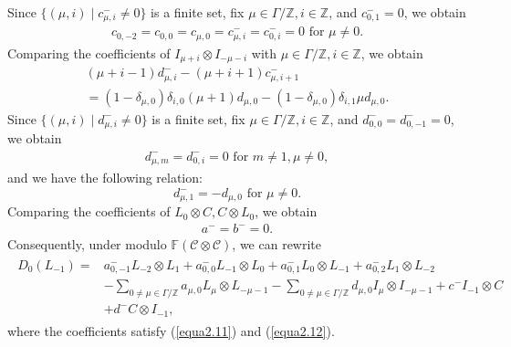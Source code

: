 \documentclass{amsart}
\theoremstyle{definition}
\theoremstyle{remark}
\numberwithin{equation}{subsection}
\numberwithin{equation}{section}
\begin{document}
  Since $\{(\mu,i)\mid c^{-}_{\mu,i}\neq 0 \}$  is a finite set,
  fix $\mu\in \Gamma/\mathbb{Z},i\in \mathbb{Z}$, and $c^{-}_{0,1}=0$,   we obtain
  $$\begin{array}{llll}
  c_{0,-2}=c_{0,0}=c_{\mu,0}
  =c^{-}_{\mu,i}=c^{-}_{0,i}=0  \mbox{ \ for \ } \mu\neq 0.
  \end{array}$$
Comparing the coefficients of $I_{\mu+i} \otimes I_{-\mu-i}$  with
  $\mu\in \Gamma/\mathbb{Z},i\in \mathbb{Z}$, we obtain
  $$\begin{array}{llll}
  (\mu+i-1)d^{-}_{\mu,i}-(\mu+i+1)c^{-}_{\mu,i+1}    \\[12pt]
  =(1-\delta_{\mu,0})\delta_{i,0}(\mu+1)d_{\mu,0}-(1-\delta_{\mu,0})\delta_{i,1}\mu
  d_{\mu,0}.
  \end{array}$$
   Since $\{(\mu,i)\mid d^{-}_{\mu,i}\neq 0 \}$  is a finite set,
   fix $\mu\in \Gamma/\mathbb{Z},i\in \mathbb{Z}$, and $d^{-}_{0,0}=d^{-}_{0,-1}=0$,   we obtain
   $$\begin{array}{llll}
    d^{-}_{\mu,m}=d^{-}_{0,i}=0  \mbox{ \ for \ } m\neq 1,\mu\neq 0,
   \end{array}$$
 and we have the following relation:
 \begin{equation}
 \label{equa2.12}
 d^{-}_{\mu,1}= -d_{\mu,0}  \mbox{ \ for \ } \mu\neq 0.
 \end{equation}
Comparing the coefficients of $L_0 \otimes C,C\otimes L_0$, we
obtain
 $$\begin{array}{lllll}
 a^{-}= b^{-}=0.
 \end{array}$$
Consequently, under modulo $\mathbb{F}(\mathcal {C}\otimes \mathcal
{C})$, we can rewrite
\begin{eqnarray}\label{equa2.13}
\begin{split}
 D_0(L_{-1})=& a^{-}_{0,-1}L_{-2}\otimes L_1+ a^{-}_{0,0}L_{-1}\otimes L_0
 + a^{-}_{0,1}L_0\otimes L_{-1}+ a^{-}_{0,2}L_1\otimes
 L_{-2} \\&
 -\underset{0\neq\mu\in \Gamma/\mathbb{Z}}{\sum}{a_{\mu,0} L_\mu \otimes
 L_{-\mu-1}}-\underset{0\neq\mu\in \Gamma/\mathbb{Z}}{\sum}{d_{\mu,0}I_\mu \otimes I_{-\mu-1}}
+c^{-}I_{-1}\otimes C \\& +d^{-}C \otimes I_{-1},
\end{split}
\end{eqnarray}
where the coefficients satisfy (\ref{equa2.11}) and
(\ref{equa2.12}).
\end{document}
